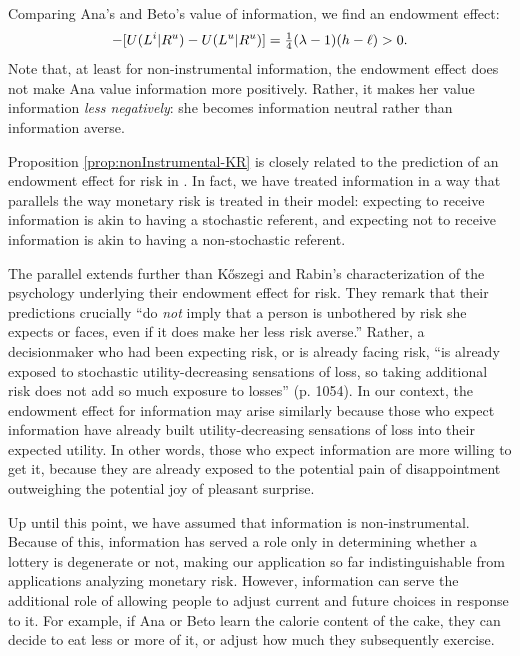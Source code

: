 Comparing Ana's and Beto's value of information, we find an endowment effect:
\begin{equation*}
  [U(L^i|R^i)-U(L^u|R^i)]-[U(L^i|R^u)-U(L^u|R^u)]=\qrtr(\lambda-1)(h-\ell)>0.
\end{equation*}
Note that, at least for non-instrumental information, the endowment effect does not make Ana value information more positively. Rather, it makes her value information \emph{less negatively}: she becomes information neutral rather than information averse.

Proposition \ref{prop:nonInstrumental-KR} is closely related to the prediction of an endowment effect for risk in \citet{koszegiReferenceDependentRiskAttitudes2007}. In fact, we have treated information in a way that parallels the way monetary risk is treated in their model: expecting to receive information is akin to having a stochastic referent, and expecting not to receive information is akin to having a non-stochastic referent.

The parallel extends further than Kőszegi and Rabin’s characterization of the psychology underlying their endowment effect for risk. They remark that their predictions crucially \enquote{do \emph{not} imply that a person is unbothered by risk she expects or faces, even if it does make her less risk averse.} Rather, a decisionmaker who had been expecting risk, or is already facing risk, \enquote{is already exposed to stochastic utility-decreasing sensations of loss, so taking additional risk does not add so much exposure to losses} (p. 1054). In our context, the endowment effect for information may arise similarly because those who expect information have already built utility-decreasing sensations of loss into their expected utility. In other words, those who expect information are more willing to get it, because they are already exposed to the potential pain of disappointment outweighing the potential joy of pleasant surprise.

\FloatBarrier

Up until this point, we have assumed that information is non-instrumental. Because of this, information has served a role only in determining whether a lottery is degenerate or not, making our application so far indistinguishable from applications analyzing monetary risk. However, information can serve the additional role of allowing people to adjust current and future choices in response to it. For example, if Ana or Beto learn the calorie content of the cake, they can decide to eat less or more of  it, or adjust how much they subsequently exercise.

